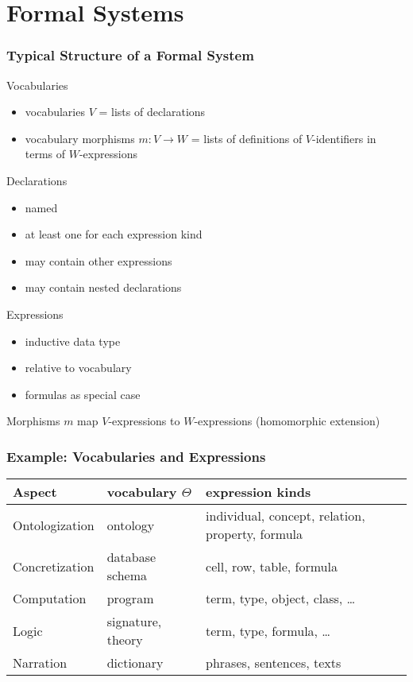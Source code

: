 \section{Formal Systems}

\begin{frame}\frametitle{Typical Structure of a Formal System}
Vocabularies
\begin{itemize}
\item vocabularies $V$ = lists of declarations
\item vocabulary morphisms $m:V\to W$ = lists of definitions of $V$-identifiers in terms of $W$-expressions
\end{itemize}

Declarations
\begin{itemize}
\item named
\item at least one for each expression kind
\item may contain other expressions 
\item may contain nested declarations 
\end{itemize}

Expressions
\begin{itemize}
\item inductive data type
\item relative to vocabulary 
\item formulas as special case
\end{itemize}
Morphisms $m$ map $V$-expressions to $W$-expressions (homomorphic extension)
\end{frame}

\begin{frame}\frametitle{Example: Vocabularies and Expressions}
\begin{center}
\footnotesize
\begin{tabular}{l|ll}
Aspect & vocabulary $\Theta$ & expression kinds \\
\hline
Ontologization  & ontology & individual, concept, relation, property, formula \\
Concretization & database schema & cell, row, table, formula \\
Computation & program & term, type, object, class, \ldots \\
Logic & signature, theory & term, type, formula, \ldots \\
Narration & dictionary & phrases, sentences, texts \\
\end{tabular}
\end{center}
\end{frame}

